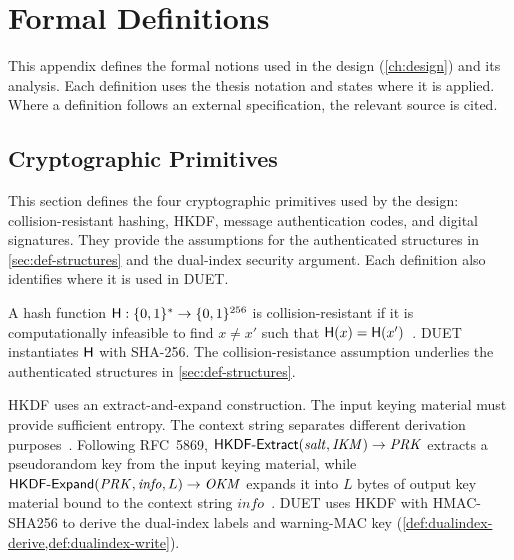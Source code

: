\chapter{Formal Definitions}\label{app:definitions}

This appendix defines the formal notions used in the design (\cref{ch:design}) and its analysis.
Each definition uses the thesis notation and states where it is applied. Where a definition follows
an external specification, the relevant source is cited.

\section{Cryptographic Primitives}\label{sec:def-primitives}

This section defines the four cryptographic primitives used by the design: collision-resistant
hashing, HKDF, message authentication codes, and digital signatures. They provide the assumptions
for the authenticated structures in \cref{sec:def-structures} and the dual-index security argument.
Each definition also identifies where it is used in DUET.

\begin{definition}\label{def:hash}
A hash function $\mathsf{H}:\{0,1\}^*\to\{0,1\}^{256}$ is collision-resistant if it is computationally
infeasible to find $x\neq x'$ such that
$\mathsf{H}(x)=\mathsf{H}(x')$~\cite{dowling2025hashfunctions}.
DUET instantiates $\mathsf{H}$ with SHA-256. The collision-resistance assumption underlies the
authenticated structures in \cref{sec:def-structures}.
\end{definition}

\begin{definition}\label{def:hkdf}
HKDF uses an extract-and-expand construction. The input keying material must provide sufficient
entropy. The context string separates different derivation
purposes~\cite{dowling2025mackdfs}.
Following RFC~5869, $\mathsf{HKDF\text{-}Extract}(\mathit{salt},\mathit{IKM})\to\mathit{PRK}$ extracts a pseudorandom key
from the input keying material, while
$\mathsf{HKDF\text{-}Expand}(\mathit{PRK},\mathit{info},L)\to\mathit{OKM}$ expands it into $L$ bytes of output key
material bound to the context string $\mathit{info}$~\cite[Sections~2.2--2.3 and~3.2]{rfc5869}.
DUET uses HKDF with HMAC-SHA256 to derive the dual-index labels and warning-MAC key
(\cref{def:dualindex-derive,def:dualindex-write}).
\end{definition}

